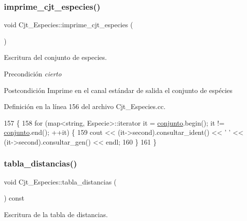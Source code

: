 \subsubsection{\texorpdfstring{imprime\+\_\+cjt\+\_\+especies()}{imprime\_cjt\_especies()}}
{\footnotesize\ttfamily void Cjt\+\_\+\+Especies\+::imprime\+\_\+cjt\+\_\+especies (\begin{DoxyParamCaption}{ }\end{DoxyParamCaption})}



Escritura del conjunto de especies. 

\begin{DoxyPrecond}{Precondición}
{\itshape cierto} 
\end{DoxyPrecond}
\begin{DoxyPostcond}{Postcondición}
Imprime en el canal estándar de salida el conjunto de espécies 
\end{DoxyPostcond}


Definición en la línea 156 del archivo Cjt\+\_\+\+Especies.\+cc.


\begin{DoxyCode}
157 \{
158     \textcolor{keywordflow}{for} (map<string, Especie>::iterator it = \hyperlink{class_cjt___especies_a82ed53cbd620caca3db6b5c20b37a60a}{conjunto}.begin(); it != 
      \hyperlink{class_cjt___especies_a82ed53cbd620caca3db6b5c20b37a60a}{conjunto}.end(); ++it) \{
159         cout << (it->second).consultar\_ident() << \textcolor{charliteral}{' '} << (it->second).consultar\_gen() << endl;
160     \}
161 \}
\end{DoxyCode}
\mbox{\label{class_cjt___especies_a539b1f0c4b31a868e5961dc9a6920497}} 
\subsubsection{\texorpdfstring{tabla\+\_\+distancias()}{tabla\_distancias()}}
{\footnotesize\ttfamily void Cjt\+\_\+\+Especies\+::tabla\+\_\+distancias (\begin{DoxyParamCaption}{ }\end{DoxyParamCaption}) const}



Escritura de la tabla de distancias. 

